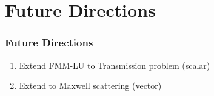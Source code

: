 \section{Future Directions}

\begin{frame}
    \frametitle{Future Directions}

    \begin{enumerate}
        \item Extend FMM-LU to Transmission problem (scalar)
        \item Extend to Maxwell scattering (vector)
    \end{enumerate}

\end{frame}